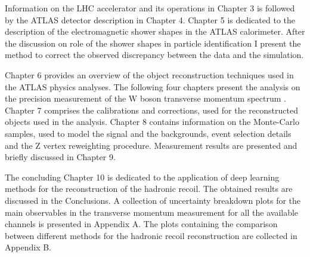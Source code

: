 Information on the LHC accelerator and its operations in Chapter 3 is followed by the ATLAS detector description in Chapter 4. Chapter 5 is dedicated to the description of the electromagnetic shower shapes in the ATLAS calorimeter. After the discussion on role of the shower shapes in particle identification I present the method to correct the observed discrepancy between the data and the simulation. 

Chapter 6 provides an overview of the object reconstruction techniques used in the ATLAS physics analyses. The following four chapters present the analysis on the precision measurement of the W boson transverse momentum spectrum . Chapter 7 comprises the calibrations and corrections, used for the reconstructed objects used in the analysis. Chapter 8 contains information on the Monte-Carlo samples, used to model the signal and the backgrounds, event selection details and the Z vertex reweighting procedure. Measurement results are presented and briefly discussed in Chapter 9.

The concluding Chapter 10 is dedicated to the application of deep learning methods for the reconstruction of the hadronic recoil. The obtained results are discussed in the Conclusions. A collection of uncertainty breakdown plots for the main observables in the transverse momentum measurement for all the available channels is presented in Appendix A. The plots containing the comparison between different methods for the hadronic recoil reconstruction are collected in Appendix B.